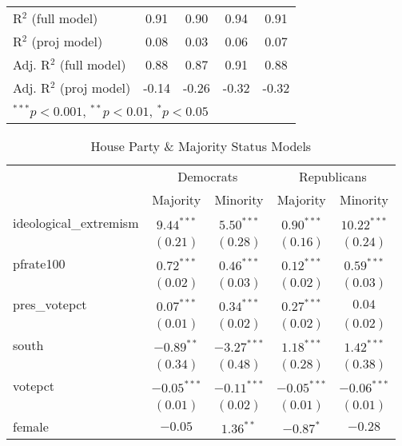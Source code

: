 \documentclass[12pt]{article}
\begin{document}
\begin{table}[H]
\begin{center}
\begin{tabular}{l c c c c }
			R$^2$ (full model)      & 0.91         & 0.90         & 0.94         & 0.91         \\
			R$^2$ (proj model)      & 0.08         & 0.03         & 0.06         & 0.07         \\
			Adj. R$^2$ (full model) & 0.88         & 0.87         & 0.91         & 0.88         \\
			Adj. R$^2$ (proj model) & -0.14        & -0.26        & -0.32        & -0.32        \\
			\hline
			\multicolumn{5}{l}{\scriptsize{$^{***}p<0.001$, $^{**}p<0.01$, $^*p<0.05$}}
		\end{tabular}
	\end{center}
\end{table}	

\begin{table}[H]
	\begin{center}
		\caption{House Party \& Majority Status Models}
		\begin{tabular}{l c c c c }
			\hline
			& \multicolumn{2}{c}{Democrats} & \multicolumn{2}{c}{Republicans} \\
			\cline{2-5}
			& Majority & Minority & Majority & Minority \\
			\hline
			ideological\_extremism & $9.44^{***}$  & $5.50^{***}$  & $0.90^{***}$  & $10.22^{***}$ \\
			& $(0.21)$      & $(0.28)$      & $(0.16)$      & $(0.24)$      \\
			pfrate100              & $0.72^{***}$  & $0.46^{***}$  & $0.12^{***}$  & $0.59^{***}$  \\
			& $(0.02)$      & $(0.03)$      & $(0.02)$      & $(0.03)$      \\
			pres\_votepct          & $0.07^{***}$  & $0.34^{***}$  & $0.27^{***}$  & $0.04$        \\
			& $(0.01)$      & $(0.02)$      & $(0.02)$      & $(0.02)$      \\
			south                  & $-0.89^{**}$  & $-3.27^{***}$ & $1.18^{***}$  & $1.42^{***}$  \\
			& $(0.34)$      & $(0.48)$      & $(0.28)$      & $(0.38)$      \\
			votepct                & $-0.05^{***}$ & $-0.11^{***}$ & $-0.05^{***}$ & $-0.06^{***}$ \\
			& $(0.01)$      & $(0.02)$      & $(0.01)$      & $(0.01)$      \\
			female                 & $-0.05$       & $1.36^{**}$   & $-0.87^{*}$   & $-0.28$       \\

\end{tabular}
\end{center}
\end{table}
\end{document}
